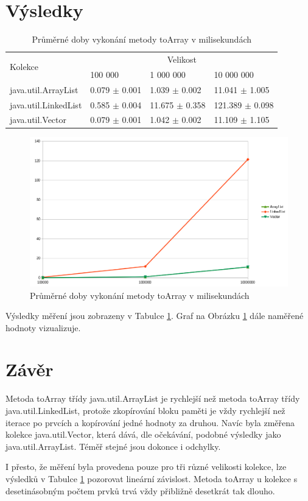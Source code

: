 \documentclass[12pt, a4paper]{article}
\begin{document}
	\section*{Výsledky}
	\begin{table}
		\scriptsize
		\caption{Průměrné doby vykonání metody toArray v milisekundách}
		\centering
		\label{tbl:results}
		\begin{tabular}{l|l|l|l|}
			\multirow{2}{*}{Kolekce} & \multicolumn{3}{c}{Velikost} \\
			& 100 000 & 1 000 000 & 10 000 000 \\
			\hline
			\hline
			java.util.ArrayList & 0.079 $\pm$ 0.001 & 1.039 $\pm$ 0.002 & 11.041 $\pm$ 1.005 \\
			java.util.LinkedList & 0.585 $\pm$ 0.004 & 11.675 $\pm$ 0.358 & 121.389 $\pm$ 0.098 \\
			java.util.Vector & 0.079 $\pm$ 0.001 & 1.042 $\pm$ 0.002 & 11.109 $\pm$ 1.105
		\end{tabular}
	\end{table}
	\begin{figure}
		\centering
		\includegraphics[width=1\linewidth]{chart}
		\caption{Průměrné doby vykonání metody toArray v milisekundách}
		\label{fig:chart}
	\end{figure}

	Výsledky měření jsou zobrazeny v Tabulce \ref{tbl:results}.
	Graf na Obrázku \ref{fig:chart} dále naměřené hodnoty vizualizuje.
	
	\section*{Závěr}
	Metoda toArray třídy java.util.ArrayList je rychlejší než metoda toArray třídy java.util.LinkedList, protože zkopírování bloku paměti je vždy rychlejší než iterace po prvcích a kopírování jedné hodnoty za druhou.
	Navíc byla změřena kolekce java.util.Vector, která dává, dle očekávání, podobné výsledky jako java.util.ArrayList. Téměř stejné jsou dokonce i odchylky.
	
	I přesto, že měření byla provedena pouze pro tři různé velikosti kolekce, lze výsledků v Tabulce \ref{tbl:results} pozorovat lineární závislost.
	Metoda toArray u kolekce s desetinásobným počtem prvků trvá vždy přibližně desetkrát tak dlouho.
	
\end{document}
